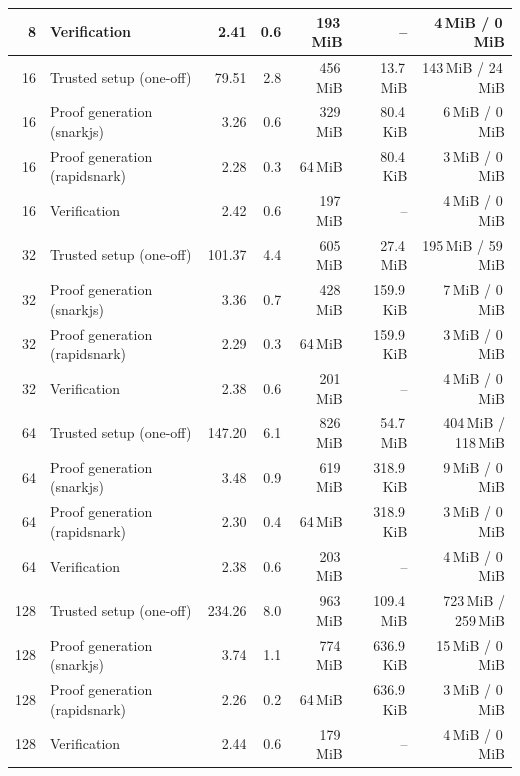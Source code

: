 \begin{table}[t]
{\begin{tabular}{|r|l|r|r|r|r|r|}
8 & Verification & 2.41 & 0.6 & 193\,MiB & -- & 4\,MiB / 0\,MiB \\
\hline
16 & Trusted setup (one-off) & 79.51 & 2.8 & 456\,MiB & 13.7\,MiB & 143\,MiB / 24\,MiB \\
16 & Proof generation (snarkjs) & 3.26 & 0.6 & 329\,MiB & 80.4\,KiB & 6\,MiB / 0\,MiB \\
16 & Proof generation (rapidsnark) & 2.28 & 0.3 & 64\,MiB & 80.4\,KiB & 3\,MiB / 0\,MiB \\
16 & Verification & 2.42 & 0.6 & 197\,MiB & -- & 4\,MiB / 0\,MiB \\
\hline
32 & Trusted setup (one-off) & 101.37 & 4.4 & 605\,MiB & 27.4\,MiB & 195\,MiB / 59\,MiB \\
32 & Proof generation (snarkjs) & 3.36 & 0.7 & 428\,MiB & 159.9\,KiB & 7\,MiB / 0\,MiB \\
32 & Proof generation (rapidsnark) & 2.29 & 0.3 & 64\,MiB & 159.9\,KiB & 3\,MiB / 0\,MiB \\
32 & Verification & 2.38 & 0.6 & 201\,MiB & -- & 4\,MiB / 0\,MiB \\
\hline
64 & Trusted setup (one-off) & 147.20 & 6.1 & 826\,MiB & 54.7\,MiB & 404\,MiB / 118\,MiB \\
64 & Proof generation (snarkjs) & 3.48 & 0.9 & 619\,MiB & 318.9\,KiB & 9\,MiB / 0\,MiB \\
64 & Proof generation (rapidsnark) & 2.30 & 0.4 & 64\,MiB & 318.9\,KiB & 3\,MiB / 0\,MiB \\
64 & Verification & 2.38 & 0.6 & 203\,MiB & -- & 4\,MiB / 0\,MiB \\
\hline
128 & Trusted setup (one-off) & 234.26 & 8.0 & 963\,MiB & 109.4\,MiB & 723\,MiB / 259\,MiB \\
128 & Proof generation (snarkjs) & 3.74 & 1.1 & 774\,MiB & 636.9\,KiB & 15\,MiB / 0\,MiB \\
128 & Proof generation (rapidsnark) & 2.26 & 0.2 & 64\,MiB & 636.9\,KiB & 3\,MiB / 0\,MiB \\
128 & Verification & 2.44 & 0.6 & 179\,MiB & -- & 4\,MiB / 0\,MiB \\
\hline
\end{tabular}}
\end{table}
